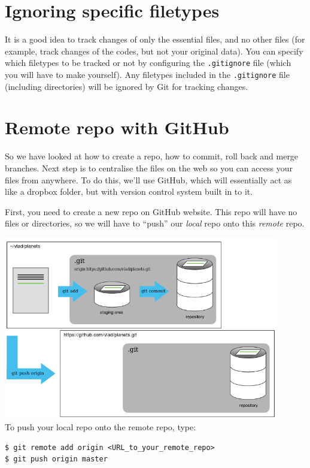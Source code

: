 \documentclass[a4paper, 12pt]{article}
\begin{document}
\section*{Ignoring specific filetypes}

It is a good idea to track changes of only the essential files, and no other files (for example, track changes of the codes, but not your original data).
You can specify which filetypes to be tracked or not by configuring the \verb|.gitignore| file (which you will have to make yourself).
Any filetypes included in the \verb|.gitignore| file (including directories) will be ignored by Git for tracking changes.

\section*{Remote repo with GitHub}

So we have looked at how to create a repo, how to commit, roll back and merge branches.
Next step is to centralise the files on the web so you can access your files from anywhere.
To do this, we'll use GitHub, which will essentially act as like a dropbox folder, but with version control system built in to it.

First, you need to create a new repo on GitHub  website.
This repo will have no files or directories, so we will have to ``push'' our {\itshape local} repo onto this {\itshape remote} repo.

\includegraphics[width=0.9\textwidth]{./images/github}
\\To push your local repo onto the remote repo, type:
\begin{lstlisting}
$ git remote add origin <URL_to_your_remote_repo>
$ git push origin master
\end{lstlisting}
\end{document}
